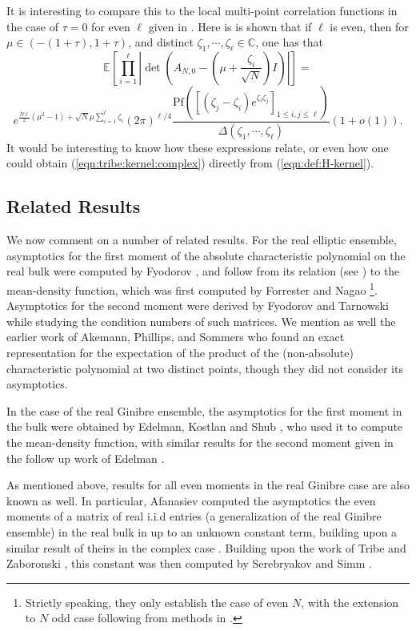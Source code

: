 \documentclass[12pt]{article}
\newcommand{\C}{\mathbb{C}}
\newcommand{\E}{\mathbb{E}}
\numberwithin{info}{section}
\numberwithin{equation}{section}
\renewcommand{\[}{\begin{equation}}
\renewcommand{\]}{\end{equation}}
\newcommand{\<}{\langle}
\renewcommand{\>}{\rangle}
\newcommand{\pf}{\mathrm{Pf}}
\renewcommand{\l}{\left}
\renewcommand{\r}{\right}
\begin{document}
	It is interesting to compare this to the local multi-point correlation functions in the case of $\tau=0$ for even $\ell$ given in \cite{nickrecent}. Here is is shown that if $\ell$ is even, then for $\mu\in (-(1+\tau),1+\tau)$, and distinct $\zeta_1,\cdots,\zeta_\ell\in \C$, one has that
	\[
	\E\left[\prod_{i=1}^{\ell}\l|\det(A_{N,0}-\left(\mu+\frac{\zeta_i}{\sqrt{N}}\right)I)\r|\right]=
	\]
	\[
	e^{\frac{N \ell}{2} \left(\mu^2-1\right)+\sqrt{N}\mu \sum_{i=1}^{\ell} \zeta_i}(2\pi)^{\ell/4}\frac{\pf([(\zeta_j-\zeta_i)e^{\zeta_i\zeta_j}]_{1\le i,j\le \ell})}{\Delta(\zeta_1,\cdots,\zeta_\ell)}\l(1+o(1)\r).\label{eqn:tribe:kernel:complex}
	\]
	It would be interesting to know how these expressions relate, or even how one could obtain (\ref{eqn:tribe:kernel:complex}) directly from (\ref{eqn:def:H-kernel}).
	
	\subsection{Related Results}
	
	We now comment on a number of related results. For the real elliptic ensemble, asymptotics for the first moment of the absolute characteristic polynomial on the real bulk were computed by Fyodorov \cite{complexity-fyodorov-non-gradient}, and follow from its relation (see \cite{fyo-maywigner-1}) to the mean-density function, which was first computed by Forrester and Nagao \cite{forrester-elliptic}\footnote{Strictly speaking, they only establish the case of even $N$, with the extension to $N$ odd case following from methods in \cite{forrester-odd,sinclair}.}. Asymptotics for the second moment were derived by Fyodorov and Tarnowski \cite{fyo-condition-elliptic} while studying the condition numbers of such matrices. We mention as well the earlier work of Akemann, Phillips, and Sommers \cite{akemann1} who found an exact representation for the expectation of the product of the (non-absolute) characteristic polynomial at two distinct points, though they did not consider its asymptotics. 
	
	In the case of the real Ginibre ensemble, the asymptotics for the first moment in the bulk were obtained by Edelman, Kostlan and Shub \cite{edelman1}, who used it to compute the mean-density function, with similar results for the second moment given in the follow up work of Edelman \cite{edelman2}. 
	
	As mentioned above, results for all even moments in the real Ginibre case are also known as well. In particular, Afanasiev computed the asymptotics the even moments of a matrix of real i.i.d entries (a generalization of the real Ginibre ensemble) in the real bulk in \cite{afanasievreal} up to an unknown constant term, building upon a similar result of theirs in the complex case \cite{afanasievComplex}. Building upon the work of Tribe and Zaboronski \cite{tribe1,tribe3}, this constant was then computed by Serebryakov and Simm \cite{nickrecent}.
	
\end{document}
